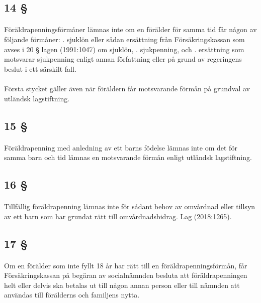\documentclass[a4paper,notitlepage,openany,10pt]{book}
\begin{document}
\subsection*{14 §}
\paragraph*{}
Föräldrapenningsförmåner lämnas inte om en förälder för samma tid får någon av följande förmåner:
. sjuklön eller sådan ersättning från Försäkringskassan som avses i 20 § lagen (1991:1047) om sjuklön,
. sjukpenning, och
. ersättning som motsvarar sjukpenning enligt annan författning eller på grund av regeringens beslut i ett särskilt fall.
\paragraph*{}
Första stycket gäller även när föräldern får motsvarande förmån på grundval av utländsk lagstiftning.
\subsection*{15 §}
\paragraph*{}
Föräldrapenning med anledning av ett barns födelse lämnas inte om det för samma barn och tid lämnas en motsvarande förmån enligt utländsk lagstiftning.
\subsection*{16 §}
\paragraph*{}
Tillfällig föräldrapenning lämnas inte för sådant behov av omvårdnad eller tillsyn av ett barn som har grundat rätt till omvårdnadsbidrag.
Lag (2018:1265).
\subsection*{17 §}
\paragraph*{}
Om en förälder som inte fyllt 18 år har rätt till en föräldrapenningsförmån, får Försäkringskassan på begäran av socialnämnden besluta att föräldrapenningen helt eller delvis ska betalas ut till någon annan person eller till nämnden att användas till förälderns och familjens nytta.
\end{document}
